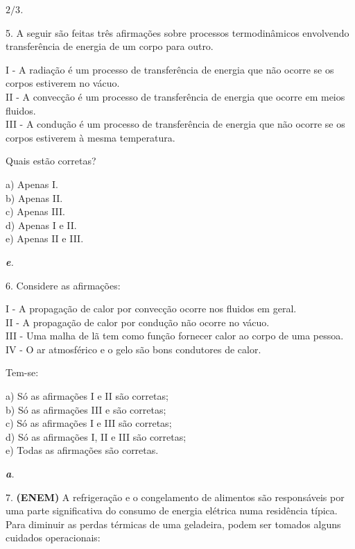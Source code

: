 \documentclass[12pt,twoside]{article}
\newenvironment{resposta*}
{\bf Resposta:\\ }
{}
\begin{document}
\begin{resposta*}
{\it $2/3$.}
\end{resposta*}

5. A seguir são feitas três afirmações sobre processos termodinâmicos envolvendo transferência de energia de um corpo para outro.


I - A radiação é um processo de transferência de energia que não ocorre se os corpos estiverem no vácuo. \\
II - A convecção é um processo de transferência de energia que ocorre em meios fluidos. \\
III - A condução é um processo de transferência de energia que não ocorre se os corpos estiverem à mesma temperatura.


Quais estão corretas?


a) Apenas I. \\
b) Apenas II. \\
c) Apenas III. \\
d) Apenas I e II. \\
e) Apenas II e III.


\begin{resposta*}
{\it \textbf{e}.}
\end{resposta*}

6. Considere as afirmações:


I - A propagação de calor por convecção ocorre nos fluidos em geral. \\
II - A propagação de calor por condução não ocorre no vácuo. \\
III - Uma malha de lã tem como função fornecer calor ao corpo de uma pessoa. \\
IV - O ar atmosférico e o gelo são bons condutores de calor.


Tem-se:


a) Só as afirmações I e II são corretas; \\
b) Só as afirmações III e são corretas; \\
c) Só as afirmações I e III são corretas; \\
d) Só as afirmações I, II e III são corretas; \\
e) Todas as afirmações são corretas.


\begin{resposta*}
{\it \textbf{a}.}
\end{resposta*}

7. \textbf{(ENEM)} A refrigeração e o congelamento de alimentos são responsáveis por uma parte significativa do consumo de energia elétrica numa residência típica. Para diminuir as perdas térmicas de uma geladeira, podem ser tomados alguns cuidados operacionais:
\end{document}
